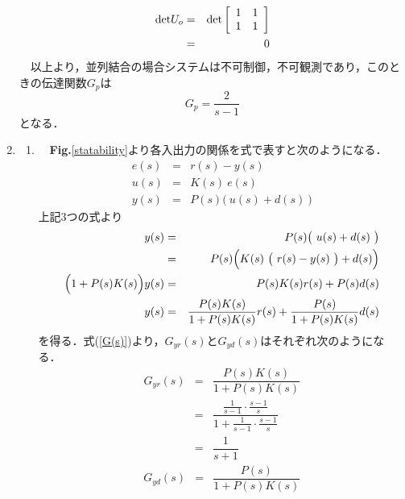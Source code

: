 \documentclass[a4paper,11pt]{jarticle}
\begin{document}
\begin{enumerate}
\begin{eqnarray}
	{\rm det} U_o & = & {\rm det}\left[
				     \begin{array}{cc}
				      1 & 1 \\
				      1 & 1 \\
				     \end{array}\right] \nonumber \\
	              & = & 0
       \end{eqnarray}
       \ \ 以上より，並列結合の場合システムは不可制御，不可観測であり，このときの伝達関数$ G_p $は
       \begin{equation}
	G_p = \dfrac{2}{s-1}
       \end{equation}
       となる．
 \item
  \begin{enumerate}[(1)]
   \setlength{\leftskip}{2mm}
   \item \ \ {\bf Fig.}{\ref{statability}}より各入出力の関係を式で表すと次のようになる．
	 \begin{eqnarray}
	  e(s) & = & r(s) - y(s)\\
	  u(s) & = & K(s)~e(s)\\
	  y(s) & = & P(s) \bigl(~ u(s) + d(s) ~\bigr)
	 \end{eqnarray}
	 上記3つの式より
	 \begin{eqnarray}
	  y(s) & = & P(s) \bigl(~ u(s) + d(s) ~\bigr) \nonumber \\
	       & = & P(s) \Bigl( K(s) ~\bigl(~ r(s) - y(s) ~\bigr) + d(s) \Bigr) \nonumber \\
	  \Bigl( 1 + P(s)K(s) \Bigr) y(s) & = & P(s)K(s)r(s) + P(s)d(s) \nonumber \\
	  y(s) & = & \dfrac{P(s)K(s)}{1 + P(s)K(s)}r(s) + \dfrac{P(s)}{1 + P(s)K(s)}d(s)
	 \label{G(s)}
	 \end{eqnarray}
	 を得る．式(\ref{G(s)})より，$ G_{yr}(s) $と$ G_{yd}(s) $はそれぞれ次のようになる．
	 \begin{eqnarray}
	  G_{yr}(s) & = & \dfrac{P(s)K(s)}{1 + P(s)K(s)} \nonumber \\
	            & = & \dfrac{ \frac{1}{s-1} \cdot \frac{s-1}{s} }{ 1 + \frac{1}{s-1} \cdot \frac{s-1}{s} } \nonumber\\
	            & = & \dfrac{1}{s+1}
	  \label{Gyr}
	 \end{eqnarray}
	 \begin{eqnarray}
	  G_{yd}(s) & = & \dfrac{P(s)}{1 + P(s)K(s)} \nonumber \\

\end{eqnarray}
\end{enumerate}
\end{enumerate}
\end{document}
